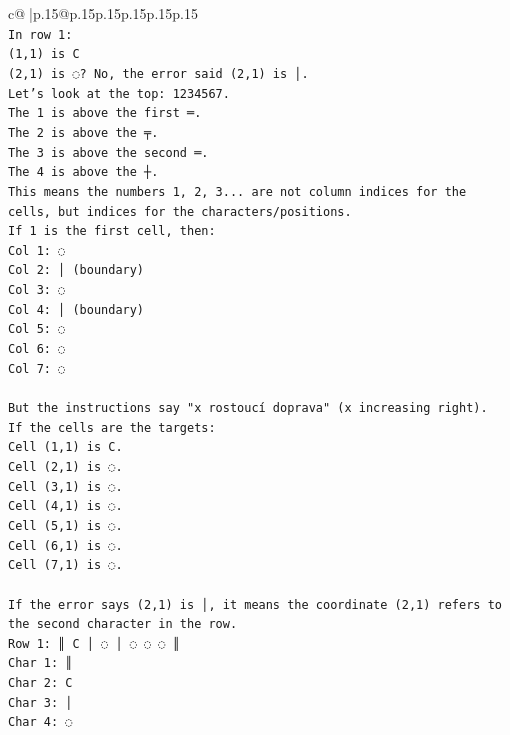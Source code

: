 \documentclass{article}
\begin{document}
{\begin{supertabular}{c@{$\;$}|p{.15\linewidth}@{}p{.15\linewidth}p{.15\linewidth}p{.15\linewidth}p{.15\linewidth}p{.15\linewidth}}
{{{\\ 
\texttt{In row 1:} \\
\texttt{(1,1) is C} \\
\texttt{(2,1) is ◌? No, the error said (2,1) is │.} \\
\texttt{Let's look at the top:  1234567.} \\
\texttt{The 1 is above the first ═.} \\
\texttt{The 2 is above the ╤.} \\
\texttt{The 3 is above the second ═.} \\
\texttt{The 4 is above the ┼.} \\
\texttt{This means the numbers 1, 2, 3... are not column indices for the cells, but indices for the characters/positions.} \\
\texttt{If 1 is the first cell, then:} \\
\texttt{Col 1: ◌} \\
\texttt{Col 2: │ (boundary)} \\
\texttt{Col 3: ◌} \\
\texttt{Col 4: │ (boundary)} \\
\texttt{Col 5: ◌} \\
\texttt{Col 6: ◌} \\
\texttt{Col 7: ◌} \\
\\ 
\texttt{But the instructions say "x rostoucí doprava" (x increasing right).} \\
\texttt{If the cells are the targets:} \\
\texttt{Cell (1,1) is C.} \\
\texttt{Cell (2,1) is ◌.} \\
\texttt{Cell (3,1) is ◌.} \\
\texttt{Cell (4,1) is ◌.} \\
\texttt{Cell (5,1) is ◌.} \\
\texttt{Cell (6,1) is ◌.} \\
\texttt{Cell (7,1) is ◌.} \\
\\ 
\texttt{If the error says (2,1) is │, it means the coordinate (2,1) refers to the second character in the row.} \\
\texttt{Row 1: ║ C │ ◌ │ ◌ ◌ ◌ ║} \\
\texttt{Char 1: ║} \\
\texttt{Char 2: C} \\
\texttt{Char 3: │} \\
\texttt{Char 4: ◌} \\
}}}
\end{supertabular}}
\end{document}
